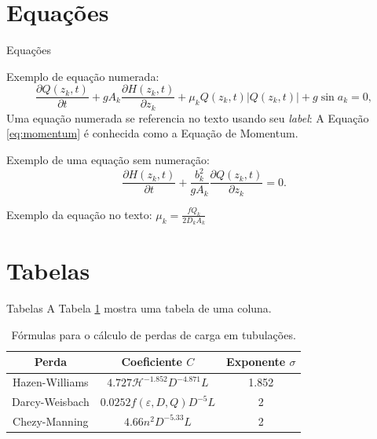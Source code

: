 \documentclass{beamer}
\begin{document}
\section{Equações}
\begin{frame}{Equações}

    Exemplo de equação numerada:
    \begin{equation}
        \frac{\partial Q\left(z_k,t\right)}{\partial t}+gA_k\frac{\partial H\left(z_k,t\right)}{\partial z_k}+\mu_kQ\left(z_k,t\right)\left|Q\left(z_k,t\right)\right|+g\sin{a_k}=0,
        \label{eq:momentum}
    \end{equation}
    Uma equação numerada se referencia no texto usando seu \textit{label}: A Equação \eqref{eq:momentum} é conhecida como a Equação de Momentum.
    
    Exemplo de uma equação sem numeração:
    $$\frac{\partial H\left(z_k,t\right)}{\partial t}+\frac{b_k^2}{gA_k}\frac{\partial Q\left(z_k,t\right)}{\partial z_k}=0.$$

    Exemplo da equação no texto: $\mu_k=\frac{fQ_k}{2D_kA_k}$  
\end{frame}


\section{Tabelas}
\begin{frame}{Tabelas}
    A Tabela \ref{tab:ModelosPerdida} mostra uma tabela de uma coluna. 
    
    \begin{table}[htbp]
        \centering
         \caption{Fórmulas para o cálculo de perdas de carga em tubulações.\break}
         \vspace{-\baselineskip}
        \label{tab:ModelosPerdida}
        \small
        \begin{tabular}{ccc}
            \toprule
            \textbf{Perda} & \textbf{Coeficiente} $C$ & \textbf{Exponente} $\sigma$ \\
            \midrule
            Hazen-Williams & $4.727 \mathscr{H}^{-1.852}D^{-4.871}L$ & 1.852 \\
            Darcy-Weisbach & $0.0252f(\varepsilon, D, Q)D^{-5}L$ & 2 \\
            Chezy-Manning & $4.66n^2D^{-5.33}L$ & 2 \\
            \bottomrule
        \end{tabular}
    \end{table}
    
\end{frame}
\end{document}
